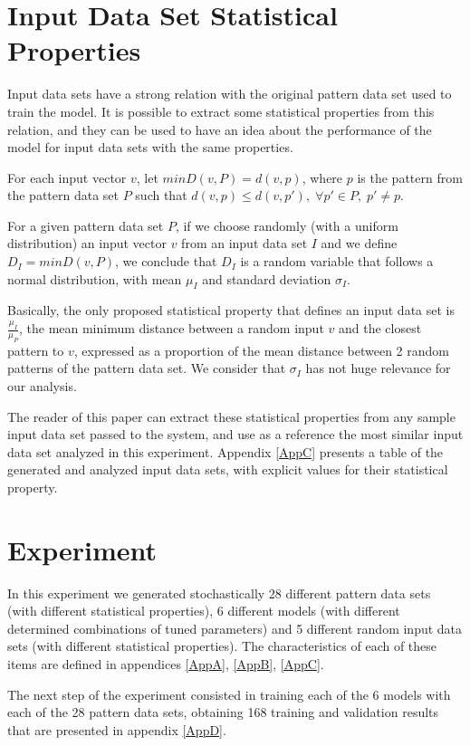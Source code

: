 \documentclass[anon]{CI}
\begin{document}
\section{Input Data Set Statistical Properties}

Input data sets have a strong relation with the original pattern data set used to train the model. It is possible to extract some statistical properties from this relation, and they can be used to have an idea about the performance of the model for input data sets with the same properties.

For each input vector $v$, let $minD(v,P)=d(v,p)$, where $p$ is the pattern from the pattern data set $P$ such that $d(v,p)\leq d(v,p'),\;\forall p'\in P,\;p'\neq p$.

For a given pattern data set $P$, if we choose randomly (with a uniform distribution) an input vector $v$ from an input data set $I$ and we define $D_I=minD(v,P)$, we conclude that $D_I$ is a random variable that follows a normal distribution, with mean $\mu_I$ and standard deviation $\sigma_I$.

Basically, the only proposed statistical property that defines an input data set is $\frac{\mu_I}{\mu_P}$, the mean minimum distance between a random input $v$ and the closest pattern to $v$, expressed as a proportion of the mean distance between 2 random patterns of the pattern data set. We consider that $\sigma_I$ has not huge relevance for our analysis.

The reader of this paper can extract these statistical properties from any sample input data set passed to the system, and use as a reference the most similar input data set analyzed in this experiment. Appendix \ref{AppC} presents a table of the generated and analyzed input data sets, with explicit values for their statistical property.
 

\section{Experiment}

In this experiment we generated stochastically 28 different pattern data sets (with different statistical properties), 6 different models (with different determined combinations of tuned parameters) and 5 different random input data sets (with different statistical properties). The characteristics of each of these items are defined in appendices \ref{AppA}, \ref{AppB}, \ref{AppC}.

The next step of the experiment consisted in training each of the 6 models with each of the 28 pattern data sets, obtaining 168 training and validation results that are presented in appendix \ref{AppD}.
\end{document}
